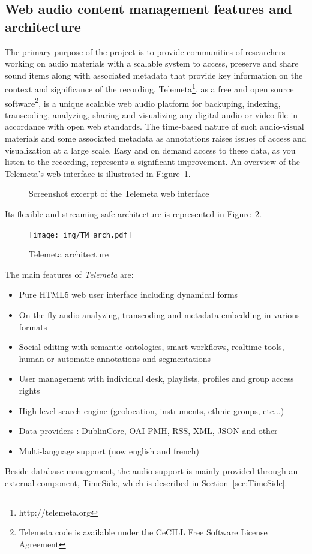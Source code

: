 \documentclass{sig-alternate}
\begin{document}
 \subsection{Web audio content management features and architecture}
The primary purpose of the project is to provide communities of researchers working on audio materials with a scalable system to access, preserve and share sound items along with associated metadata that provide key information on the context and significance of the recording.
Telemeta\footnote{http://telemeta.org}, as a free and open source software\footnote{Telemeta code is available under the CeCILL Free Software License Agreement}, is a unique scalable web audio platform for backuping, indexing, transcoding, analyzing, sharing and visualizing any digital audio or video file in accordance with open web standards.
The time-based nature of such audio-visual materials and some associated metadata as annotations raises issues of access and visualization at a large scale. Easy and on demand access to these data, as you listen to the recording, represents a significant improvement.
An overview of the Telemeta's web interface is illustrated in Figure~\ref{fig:Telemeta}.
\begin{figure}
   \centering
   \caption[1]{Screenshot excerpt of the Telemeta web interface}
    \label{fig:Telemeta}
 \end{figure}
Its flexible and streaming safe architecture is represented in Figure~\ref{fig:TM_arch}.
\begin{figure}[htbp]
  \centering
  \texttt{[image: img/TM\_arch.pdf]}
  \caption{Telemeta architecture}\label{fig:TM_arch}
\end{figure}
The main features of \emph{Telemeta} are:
      \begin{itemize}
      \item Pure HTML5 web user interface including dynamical forms
      \item On the fly audio analyzing, transcoding and metadata
        embedding in various formats
      \item Social editing with semantic ontologies, smart workflows,
        realtime tools, human or automatic annotations and
        segmentations
      \item User management with individual desk, playlists, profiles
        and group access rights
      \item High level search engine (geolocation, instruments, ethnic groups, etc...)
      \item Data providers : DublinCore, OAI-PMH, RSS, XML, JSON and other 
      \item Multi-language support (now english and french)
      \end{itemize}
Beside database management, the audio support is mainly provided through an external component, TimeSide, which is described in Section~\ref{sec:TimeSide}.
\end{document}
